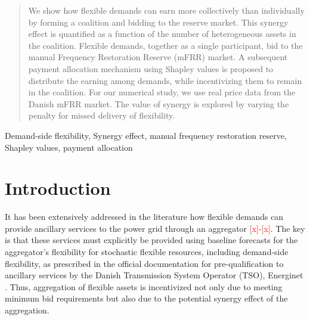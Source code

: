 \documentclass[lettersize,journal]{IEEEtran}
\newcommand{\red}[1]{\textcolor{red}{#1}}
\begin{document}
\begin{abstract}
    We show how flexible demands can earn more collectively than individually by forming a coalition and bidding to the reserve market. This synergy effect is quantified as a function of the number of heterogeneous assets in the coalition. Flexible demands, together as a single participant, bid to the manual Frequency Restoration Reserve (mFRR) market. A subsequent payment allocation mechanism using Shapley values is proposed to distribute the earning among demands, while incentivizing them to remain in the coalition. For our numerical study, we use real price data from the Danish mFRR market. The value of synergy is explored by varying the penalty for missed delivery of flexibility.
\end{abstract}

\begin{IEEEkeywords}
    Demand-side flexibility, Synergy effect, manual frequency restoration reserve, Shapley values, payment allocation
\end{IEEEkeywords}

\tableofcontents

\section{Introduction}\label{sec:Introduction}

It has been extensively addressed in the literature how flexible demands can provide ancillary services to the power grid through an aggregator \red{[x]-[x]}.
The key is that these services must explicitly be provided using baseline forecasts for the aggregator's flexibility for stochastic flexible resources, including demand-side flexibility, as prescribed in the official documentation for pre-qualification to ancillary services by  the Danish Transmission System Operator (TSO), Energinet \cite{energinet:prequalification}. Thus, aggregation of flexible assets is incentivized not only due to meeting minimum bid requirements \cite{energinet:Systemydelser} but also due to the potential synergy effect of the aggregation.
\end{document}
